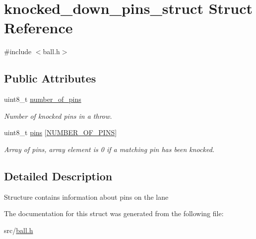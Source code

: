 \hypertarget{structknocked__down__pins__struct}{\section{knocked\-\_\-down\-\_\-pins\-\_\-struct Struct Reference}
\label{structknocked__down__pins__struct}
}


{\ttfamily \#include $<$ball.\-h$>$}

\subsection*{Public Attributes}
\begin{DoxyCompactItemize}
\item 
\hypertarget{structknocked__down__pins__struct_a3606952e44cf1005d256d5fe65eea7be}{uint8\-\_\-t \hyperlink{structknocked__down__pins__struct_a3606952e44cf1005d256d5fe65eea7be}{number\-\_\-of\-\_\-pins}}\label{structknocked__down__pins__struct_a3606952e44cf1005d256d5fe65eea7be}

\begin{DoxyCompactList}\small\item\em Number of knocked pins in a throw. \end{DoxyCompactList}\item 
\hypertarget{structknocked__down__pins__struct_ac8a1df38140a74691f4bf38f4a7ea0c9}{uint8\-\_\-t \hyperlink{structknocked__down__pins__struct_ac8a1df38140a74691f4bf38f4a7ea0c9}{pins} \mbox{[}\hyperlink{ball_8h_a23dbd731758fa50b768f64e5c79af0e7}{N\-U\-M\-B\-E\-R\-\_\-\-O\-F\-\_\-\-P\-I\-N\-S}\mbox{]}}\label{structknocked__down__pins__struct_ac8a1df38140a74691f4bf38f4a7ea0c9}

\begin{DoxyCompactList}\small\item\em Array of pins, array element is 0 if a matching pin has been knocked. \end{DoxyCompactList}\end{DoxyCompactItemize}


\subsection{Detailed Description}
Structure contains information about pins on the lane 

The documentation for this struct was generated from the following file\-:\begin{DoxyCompactItemize}
\item 
src/\hyperlink{ball_8h}{ball.\-h}\end{DoxyCompactItemize}
